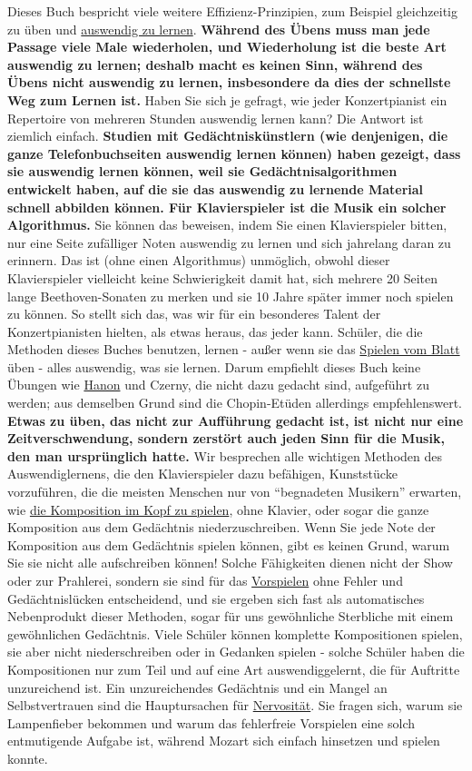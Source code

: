 Dieses Buch bespricht viele weitere Effizienz-Prinzipien, zum Beispiel gleichzeitig zu üben und \hyperref[c1iii6a]{auswendig zu lernen}.
\textbf{Während des Übens muss man jede Passage viele Male wiederholen, und Wiederholung ist die beste Art auswendig zu lernen; deshalb macht es keinen Sinn, während des Übens nicht auswendig zu lernen, insbesondere da dies der schnellste Weg zum Lernen ist.}
Haben Sie sich je gefragt, wie jeder Konzertpianist ein Repertoire von mehreren Stunden auswendig lernen kann?
Die Antwort ist ziemlich einfach.
\textbf{Studien mit Gedächtniskünstlern (wie denjenigen, die ganze Telefonbuchseiten auswendig lernen können) haben gezeigt, dass sie auswendig lernen können, weil sie Gedächtnisalgorithmen entwickelt haben, auf die sie das auswendig zu lernende Material schnell abbilden können.
Für Klavierspieler ist die Musik ein solcher Algorithmus.}
Sie können das beweisen, indem Sie einen Klavierspieler bitten, nur eine Seite zufälliger Noten auswendig zu lernen und sich jahrelang daran zu erinnern.
Das ist (ohne einen Algorithmus) unmöglich, obwohl dieser Klavierspieler vielleicht keine Schwierigkeit damit hat, sich mehrere 20 Seiten lange Beethoven-Sonaten zu merken und sie 10 Jahre später immer noch spielen zu können.
So stellt sich das, was wir für ein besonderes Talent der Konzertpianisten hielten, als etwas heraus, das jeder kann.
Schüler, die die Methoden dieses Buches benutzen, lernen - außer wenn sie das \hyperref[c1iii11]{Spielen vom Blatt} üben - alles auswendig, was sie lernen.
Darum empfiehlt dieses Buch keine Übungen wie \hyperref[c1iii7h]{Hanon} und Czerny, die nicht dazu gedacht sind, aufgeführt zu werden; aus demselben Grund sind die Chopin-Etüden allerdings empfehlenswert.
\textbf{Etwas zu üben, das nicht zur Aufführung gedacht ist, ist nicht nur eine Zeitverschwendung, sondern zerstört auch jeden Sinn für die Musik, den man ursprünglich hatte.}
Wir besprechen alle wichtigen Methoden des Auswendiglernens, die den Klavierspieler dazu befähigen, Kunststücke vorzuführen, die die meisten Menschen nur von \enquote{begnadeten Musikern} erwarten, wie 
\hyperref[c1ii12mental]{die Komposition im Kopf zu spielen}, ohne Klavier, oder sogar die ganze Komposition aus dem Gedächtnis niederzuschreiben.
Wenn Sie jede Note der Komposition aus dem Gedächtnis spielen können, gibt es keinen Grund, warum Sie sie nicht alle aufschreiben können!
Solche Fähigkeiten dienen nicht der Show oder zur Prahlerei, sondern sie sind für das \hyperref[c1iii14]{Vorspielen} ohne Fehler und Gedächtnislücken entscheidend, und sie ergeben sich fast als automatisches Nebenprodukt dieser Methoden, sogar für uns gewöhnliche Sterbliche mit einem gewöhnlichen Gedächtnis.
Viele Schüler können komplette Kompositionen spielen, sie aber nicht niederschreiben oder in Gedanken spielen - solche Schüler haben die Kompositionen nur zum Teil und auf eine Art auswendiggelernt, die für Auftritte unzureichend ist.
Ein unzureichendes Gedächtnis und ein Mangel an Selbstvertrauen sind die Hauptursachen für \hyperref[c1iii15]{Nervosität}.
Sie fragen sich, warum sie Lampenfieber bekommen und warum das fehlerfreie Vorspielen eine solch entmutigende Aufgabe ist, während Mozart sich einfach hinsetzen und spielen konnte.

